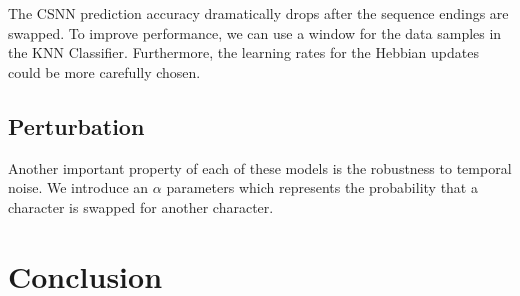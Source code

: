 \documentclass{article}
\begin{document}
The CSNN prediction accuracy dramatically drops after the sequence endings are swapped. To improve performance, we can use a window for the data samples in the KNN Classifier. Furthermore, the learning rates for the Hebbian updates could be more carefully chosen.

\subsection*{Perturbation}

Another important property of each of these models is the robustness to temporal noise. We introduce an $\alpha$ parameters which represents the probability that a character is swapped for another character. 


\section*{Conclusion}



\newpage
\printbibliography[title={References}]
\end{document}
